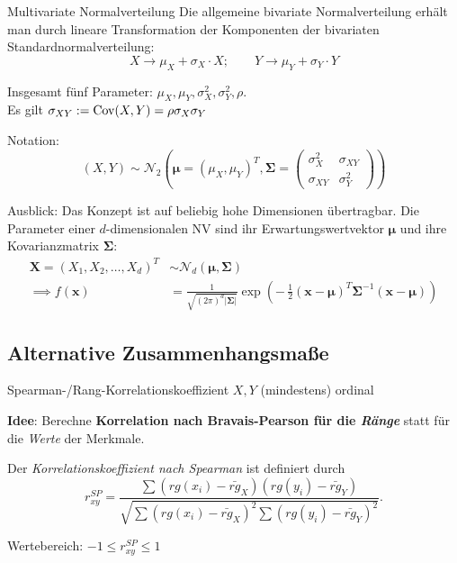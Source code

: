 \documentclass[
  10pt,
  ignorenonframetext,
]{beamer}
\begin{document}
\begin{frame}{Multivariate Normalverteilung}
\label{multivariate-normalverteilung}
Die allgemeine bivariate Normalverteilung erhält man durch lineare
Transformation der Komponenten der bivariaten Standardnormalverteilung:
\[ X \to \mu_X + \sigma_X \cdot X; \qquad Y \to \mu_Y + \sigma_Y \cdot Y\]

Insgesamt fünf Parameter:
\(\mu_X, \mu_Y, \sigma_X^2, \sigma_Y^2, \rho\).\\
Es gilt \(\sigma_{XY} := \operatorname{Cov}(X,Y) = \rho\sigma_{X}\sigma_Y\)

Notation: \[
(X, Y) \sim \mathcal N_2\left(\symbf \mu = (\mu_X, \mu_Y)^T, \symbf \Sigma = \left(\begin{smallmatrix} 
\sigma_X^2 & \sigma_{XY} \\ \sigma_{XY} & \sigma_Y^2
\end{smallmatrix}\right)\right)
\]

Ausblick: Das Konzept ist auf beliebig hohe Dimensionen übertragbar. Die
Parameter einer \(d\)-dimensionalen NV sind ihr Erwartungswertvektor
\(\symbf \mu\) und ihre Kovarianzmatrix \(\symbf \Sigma\):
\begin{align*}
\symbf X = (X_1, X_2, \dots, X_d)^T &\sim \mathcal N_d(\symbf \mu, \symbf \Sigma) \\
\implies f(\symbf x) &= \frac{1}{\sqrt{(2\pi)^d|\symbf \Sigma|}} \exp\left(
- \, \frac{1}{2} (\symbf x - \symbf \mu)^T \symbf \Sigma^{-1} (\symbf x - \symbf \mu)
\right)
\end{align*}
\end{frame}

\subsection{Alternative
Zusammenhangsmaße}\label{alternative-zusammenhangsmauxdfe}

\begin{frame}{Spearman-/Rang-Korrelationskoeffizient}
\label{spearman-rang-korrelationskoeffizient}
\(X, Y\) (mindestens) ordinal

\textbf{Idee}: Berechne \textbf{Korrelation nach Bravais-Pearson für die
\emph{Ränge}} statt für die \emph{Werte} der Merkmale.

Der \textit{Korrelationskoeffizient nach Spearman} ist definiert durch
\begin{displaymath}
r^{SP}_{xy} = \frac{\sum(rg(x_i)-\bar{rg}_X)(rg(y_i) - \bar{rg}_Y)}
{\sqrt{\sum(rg(x_i)-\bar{rg}_X)^2\sum(rg(y_i)-\bar{rg}_Y)^2}}.
\end{displaymath}

Wertebereich: \(-1 \le r^{SP}_{xy} \le 1\)
\end{frame}
\end{document}
